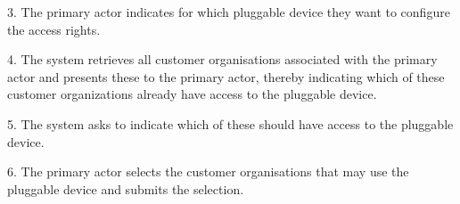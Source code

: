             3. The primary actor indicates for which pluggable device they want to configure the access rights.

            4. The system retrieves all customer organisations associated with the primary actor and presents these to the primary actor,
               thereby indicating which of these customer organizations already have access to the pluggable device.

            5. The system asks to indicate which of these should have access to the pluggable device.

            6. The primary actor selects the customer organisations that may use the pluggable device and submits the selection.


